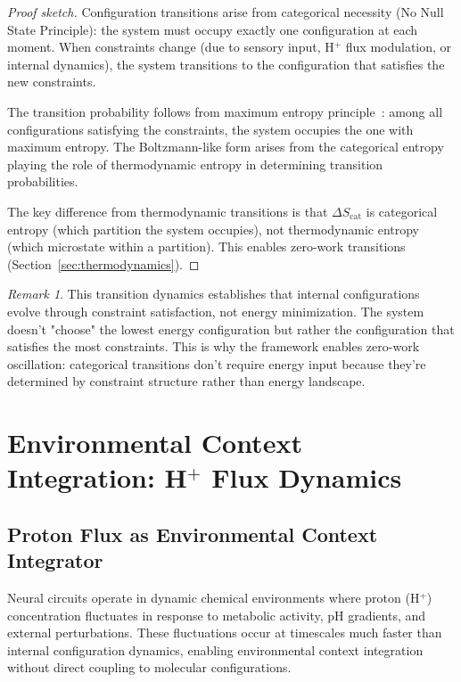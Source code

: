 \documentclass[aps,prd,twocolumn,superscriptaddress,floatfix,nofootinbib]{revtex4-2}
\theoremstyle{remark}
\newtheorem{remark}[theorem]{Remark}
\begin{document}
\begin{proof}[Proof sketch]
Configuration transitions arise from categorical necessity (No Null State Principle): the system must occupy exactly one configuration at each moment. When constraints change (due to sensory input, H$^+$ flux modulation, or internal dynamics), the system transitions to the configuration that satisfies the new constraints.

The transition probability follows from maximum entropy principle~\cite{jaynes1957information}: among all configurations satisfying the constraints, the system occupies the one with maximum entropy. The Boltzmann-like form arises from the categorical entropy playing the role of thermodynamic entropy in determining transition probabilities.

The key difference from thermodynamic transitions is that $\Delta S_{\text{cat}}$ is categorical entropy (which partition the system occupies), not thermodynamic entropy (which microstate within a partition). This enables zero-work transitions (Section~\ref{sec:thermodynamics}).
\end{proof}

\begin{remark}
This transition dynamics establishes that internal configurations evolve through constraint satisfaction, not energy minimization. The system doesn't "choose" the lowest energy configuration but rather the configuration that satisfies the most constraints. This is why the framework enables zero-work oscillation: categorical transitions don't require energy input because they're determined by constraint structure rather than energy landscape.
\end{remark}

\section{Environmental Context Integration: H$^+$ Flux Dynamics}
\label{sec:emotion}

\subsection{Proton Flux as Environmental Context Integrator}

Neural circuits operate in dynamic chemical environments where proton (H$^+$) concentration fluctuates in response to metabolic activity, pH gradients, and external perturbations. These fluctuations occur at timescales much faster than internal configuration dynamics, enabling environmental context integration without direct coupling to molecular configurations.
\end{document}

